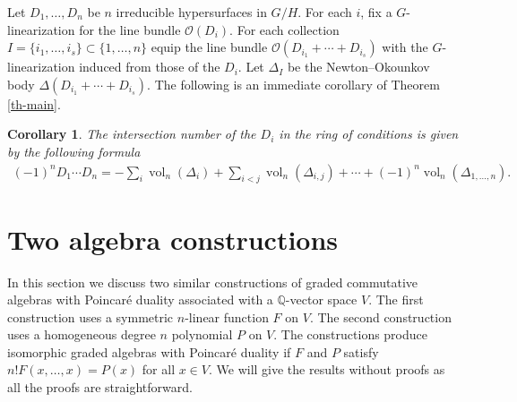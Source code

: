 \documentclass[10pt,a4paper]{amsart}
\def \Q{\mathbb{Q}}
\def \vol{\operatorname{vol}}
\numberwithin{equation}{section}
\newtheorem{Cor}[Th]{Corollary}
\theoremstyle{definition}
\begin{document}
Let $D_1, \ldots, D_n$ be $n$ irreducible hypersurfaces in $G/H$. For each $i$, fix a $G$-linearization for the line bundle $\mathcal{O}(D_i)$. For each collection $I = \{i_1, \ldots, i_s\} \subset \{1, \ldots, n\}$ equip the line bundle $\mathcal{O}(D_{i_1} + \cdots + D_{i_s})$ with the $G$-linearization induced from those of the $D_i$. Let $\Delta_I$ be the Newton--Okounkov body $\Delta(D_{i_1} + \cdots + D_{i_s})$.
The following is an immediate corollary of Theorem \ref{th-main}.
\begin{Cor} \label{cor-main}
The intersection number of the $D_i$ in the ring of conditions is given by the following formula\begin{gather*}
(-1)^n D_1 \cdots D_n = - \sum_{i} \vol_n(\Delta_i) + \sum_{i < j} \vol_n(\Delta_{i,j}) + \cdots
+ (-1)^n \vol_n(\Delta_{1, \ldots, n}).
\end{gather*}
\end{Cor}

\section{Two algebra constructions} \label{sec-alg-construction} In this section we discuss two similar constructions of graded commutative algebras with Poincar\'{e} duality associated with a $\Q$-vector space $V$. The first construction uses a symmetric $n$-linear function $F$ on $V$. The second construction uses a homogeneous degree $n$ polynomial $P$ on $V$. The constructions produce isomorphic graded algebras with Poincar\'{e} duality if $F$ and $P$ satisfy $n! F(x,\dots,x)=P(x)$ for all $x \in V$. We will give the results without proofs as all the proofs are straightforward.
\end{document}
